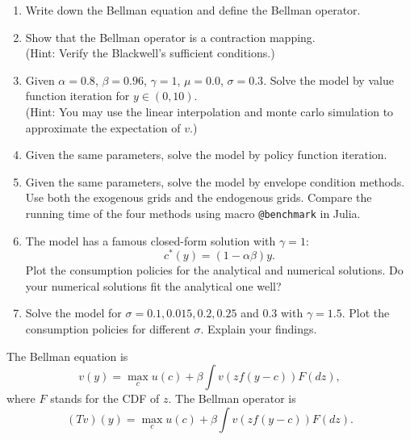 \documentclass[12pt]{article}
\begin{document}
\begin{enumerate}
    \item Write down the Bellman equation and define the Bellman operator. 
    \item Show that the Bellman operator is a contraction mapping.\\
    (Hint: Verify the Blackwell's sufficient conditions.)
    \item Given $\alpha = 0.8$, $\beta = 0.96$, $\gamma = 1$, $\mu = 0.0$, $\sigma = 0.3$. 
    Solve the model by value function iteration for $y\in(0,10)$.\\
    (Hint: You may use the linear interpolation and monte carlo simulation to 
    approximate the expectation of $v$.)
    \item Given the same parameters, solve the model by policy function 
    iteration. 
    \item Given the same parameters, solve the model by envelope condition 
    methods. Use both the exogenous grids and the endogenous grids.  
    Compare the running time of the four methods using macro 
    \texttt{@benchmark} in Julia. 
    \item The model has a famous closed-form solution with $\gamma = 1$:
    \begin{equation*}
        c^*(y) = (1-\alpha\beta)y.
    \end{equation*}
    Plot the consumption policies for the analytical and numerical solutions. 
    Do your numerical solutions fit the analytical one well?
    \item Solve the model for $\sigma = 0.1, 0.015, 0.2, 0.25$ and $0.3$ with 
    $\gamma = 1.5$. Plot the consumption policies for different $\sigma$. 
    Explain your findings. 
\end{enumerate}

\begin{sol}[1.1]
    The Bellman equation is 
    \begin{equation*}
        v(y) = \max_{c} u(c) + \beta \int v(zf(y-c)) F(dz),
    \end{equation*}
    where $F$ stands for the CDF of $z$. The Bellman operator is 
    \begin{equation*}
        (Tv)(y) = \max_{c} u(c) + \beta \int v(zf(y-c)) F(dz).
    \end{equation*}
    \solend
\end{sol}
\end{document}
